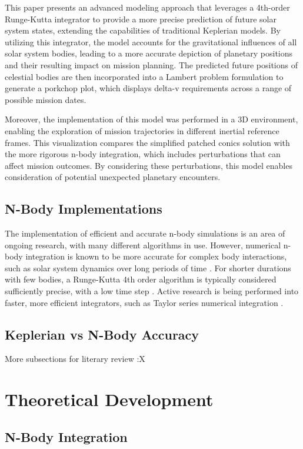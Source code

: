 \documentclass[conference]{IEEEtran}
\begin{document}
	This paper presents an advanced modeling approach that leverages a 4th-order Runge-Kutta integrator to provide a more precise prediction of future solar system states, extending the capabilities of traditional Keplerian models. By utilizing this integrator, the model accounts for the gravitational influences of all solar system bodies, leading to a more accurate depiction of planetary positions and their resulting impact on mission planning. The predicted future positions of celestial bodies are then incorporated into a Lambert problem formulation to generate a porkchop plot, which displays delta-v requirements across a range of possible mission dates.
	
	Moreover, the implementation of this model was performed in a 3D environment, enabling the exploration of mission trajectories in different inertial reference frames. This visualization compares the simplified patched conics solution with the more rigorous n-body integration, which includes perturbations that can affect mission outcomes. By considering these perturbations, this model enables consideration of potential unexpected planetary encounters.
	
	\subsection{N-Body Implementations}
	
	The implementation of efficient and accurate n-body simulations is an area of ongoing research, with many different algorithms in use. However, numerical n-body integration is known to be more accurate for complex body interactions, such as solar system dynamics over long periods of time \cite{b1}. For shorter durations with few bodies, a Runge-Kutta 4th order algorithm is typically considered sufficiently precise, with a low time step \cite{b2}. Active research is being performed into faster, more efficient integrators, such as Taylor series numerical integration \cite{b3}.
	
	\subsection{Keplerian vs N-Body Accuracy}
	More subsections for literary review :X
	
	\newpage
	
	\section{Theoretical Development}
	\subsection{N-Body Integration}
\end{document}
